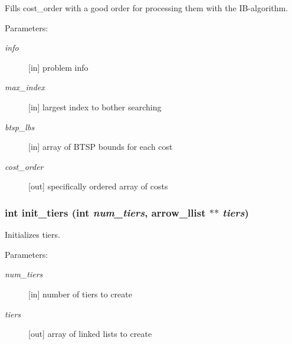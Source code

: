 Fills cost\_\-order with a good order for processing them with the IB-algorithm. 

\begin{Desc}
\item[Parameters:]
\begin{description}
\item[{\em info}]\mbox{[}in\mbox{]} problem info \item[{\em max\_\-index}]\mbox{[}in\mbox{]} largest index to bother searching \item[{\em btsp\_\-lbs}]\mbox{[}in\mbox{]} array of BTSP bounds for each cost \item[{\em cost\_\-order}]\mbox{[}out\mbox{]} specifically ordered array of costs \end{description}
\end{Desc}
\hypertarget{lib_2baltsp_2baltsp-ib_8c_05a2ff158dd6edc613a6623787c04a31}{
\subsubsection[{init\_\-tiers}]{\setlength{\rightskip}{0pt plus 5cm}int init\_\-tiers (int {\em num\_\-tiers}, \/  {\bf arrow\_\-llist} $\ast$$\ast$ {\em tiers})}}
\label{lib_2baltsp_2baltsp-ib_8c_05a2ff158dd6edc613a6623787c04a31}


Initializes tiers. 

\begin{Desc}
\item[Parameters:]
\begin{description}
\item[{\em num\_\-tiers}]\mbox{[}in\mbox{]} number of tiers to create \item[{\em tiers}]\mbox{[}out\mbox{]} array of linked lists to create \end{description}
\end{Desc}
